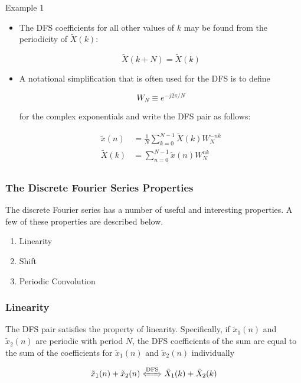 \documentclass[pdflatex,compress,mathserif]{beamer}
\begin{document}
\begin{frame}{Example 1}
	\begin{itemize}
		\item The DFS coefficients for all other values of $ k $ may be found from the periodicity of $\tilde{X}(k)$:
		
		\begin{equation*}
			\tilde{X}(k + N) = \tilde{X}(k)
		\end{equation*}
		
		\item A notational simplification that is often used for the DFS is to define
		
		\begin{equation*}
			W_N \equiv e^{-j2 \pi /N}
		\end{equation*}
		
		for the complex exponentials and write the DFS pair as follows:
		
		\begin{align*}
			\tilde{x}(n) &= \frac{1}{N}\sum\limits_{k=0}^{N-1}\tilde{X}(k)W_N^{-nk} \\
			\tilde{X}(k) &= \sum\limits_{n=0}^{N-1}\tilde{x}(n)W_N^{nk} \\
		\end{align*}
	\end{itemize}
\end{frame}

\begin{frame}
	\frametitle{The Discrete Fourier Series Properties}
	The discrete Fourier series has a number of useful and interesting properties. A few of these properties are described below.
	\begin{enumerate}
		\item Linearity
		\item Shift
		\item Periodic Convolution
	\end{enumerate}
\end{frame}

\begin{frame}
	\frametitle{Linearity}
	The DFS pair satisfies the property of linearity. Specifically, if $ \tilde{x}_1(n) $ and $ \tilde{x}_2(n) $ are periodic with period $ N $, the	DFS coefficients of the sum are equal to the sum of the coefficients for $ \tilde{x}_1(n) $ and $ \tilde{x}_2(n) $ individually

	\begin{equation*}
		\tilde{x}_1(n) + \tilde{x}_2(n) \xLeftrightarrow{\text{DFS}} \tilde{X}_1(k) + \tilde{X}_2(k)
	\end{equation*}
\end{frame}
\end{document}
